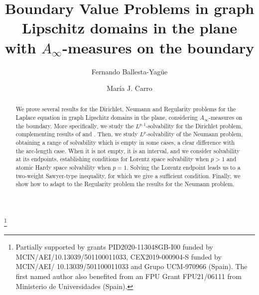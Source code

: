 \documentclass[12pt]{amsart}
\title[\texorpdfstring{B.V.P.'s with $A_{\infty}$-measures on the boundary}{}]{\texorpdfstring{Boundary Value Problems in graph Lipschitz domains in the plane with $A_{\infty}$}{}-measures on the boundary}
\author[F. Ballesta-Yag\"ue]{Fernando Ballesta-Yag\"ue}
\author[M. J. Carro]{Mar\'ia J. Carro}
\theoremstyle{plain}
\theoremstyle{definition}
\numberwithin{equation}{section}
\begin{document}
 

\thanks{Partially supported by grants PID2020-113048GB-I00 funded by MCIN/AEI/10.13039/501100011033,  CEX2019-000904-S funded by MCIN/AEI/ 10.13039/501100011033 and Grupo UCM-970966 (Spain). The first named author also benefited from an FPU Grant FPU21/06111 from Ministerio de Universidades (Spain).} 



\begin{abstract}
    We prove several results for the Dirichlet, Neumann and Regularity problems for the Laplace equation in graph Lipschitz domains in the plane, considering $A_{\infty}$-measures on the boundary. More specifically, we study the $L^{p,1}$-solvability for the Dirichlet problem, complementing results of \cite{kenigWeighted} and \cite{CarroOrtiz}. Then, we study $L^p$-solvability of the Neumann problem, obtaining a range of solvability which is empty in some cases, a clear difference with the arc-length case. When it is not empty, it is an interval, and we consider solvability at its endpoints, establishing conditions for Lorentz space solvability when $p>1$ and atomic Hardy space solvability when $p=1$. Solving the Lorentz endpoint leads us to a two-weight Sawyer-type inequality, for which we give a sufficient condition. Finally, we show how to adapt to the Regularity problem the results for the Neumann problem.
\end{abstract}

\maketitle
\end{document}
